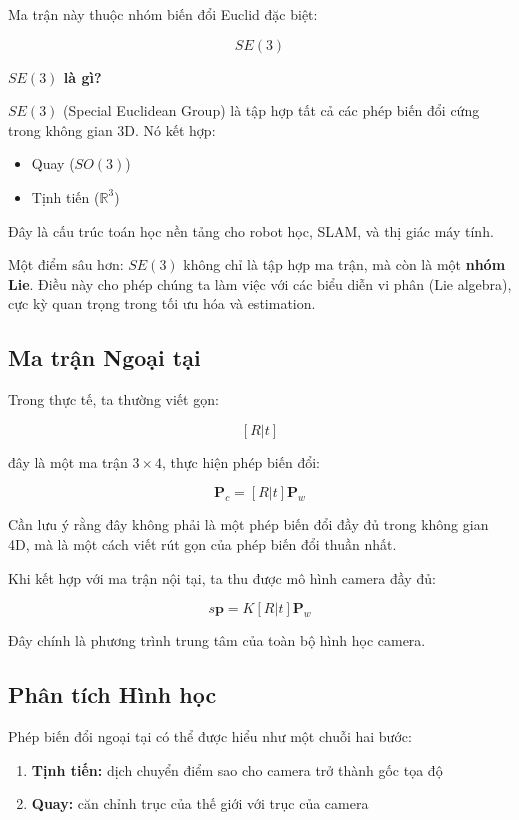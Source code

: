 Ma trận này thuộc nhóm biến đổi Euclid đặc biệt:

\[
SE(3)
\]

\begin{mdframed}[style=infobox]
	\textbf{$SE(3)$ là gì?}
	
	$SE(3)$ (Special Euclidean Group) là tập hợp tất cả các phép biến đổi cứng trong không gian 3D. Nó kết hợp:
	\begin{itemize}
		\item Quay ($SO(3)$)
		\item Tịnh tiến ($\mathbb{R}^3$)
	\end{itemize}
	
	Đây là cấu trúc toán học nền tảng cho robot học, SLAM, và thị giác máy tính.
\end{mdframed}

Một điểm sâu hơn: $SE(3)$ không chỉ là tập hợp ma trận, mà còn là một \textbf{nhóm Lie}. Điều này cho phép chúng ta làm việc với các biểu diễn vi phân (Lie algebra), cực kỳ quan trọng trong tối ưu hóa và estimation.

\subsection{Ma trận Ngoại tại}
\label{subsec:extrinsic_matrix}

Trong thực tế, ta thường viết gọn:

\[
[R | t]
\]

đây là một ma trận $3 \times 4$, thực hiện phép biến đổi:

\[
\mathbf{P}_c = [R|t] \mathbf{P}_w
\]

Cần lưu ý rằng đây không phải là một phép biến đổi đầy đủ trong không gian 4D, mà là một cách viết rút gọn của phép biến đổi thuần nhất.

Khi kết hợp với ma trận nội tại, ta thu được mô hình camera đầy đủ:

\[
s \mathbf{p} = K [R|t] \mathbf{P}_w
\]

Đây chính là phương trình trung tâm của toàn bộ hình học camera.

\subsection{Phân tích Hình học}
\label{subsec:extrinsic_geometry}

Phép biến đổi ngoại tại có thể được hiểu như một chuỗi hai bước:

\begin{enumerate}
	\item \textbf{Tịnh tiến:} dịch chuyển điểm sao cho camera trở thành gốc tọa độ
	\item \textbf{Quay:} căn chỉnh trục của thế giới với trục của camera
\end{enumerate}

